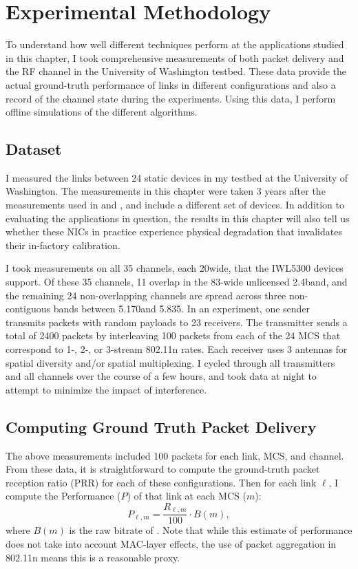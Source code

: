 \section{Experimental Methodology}
To understand how well different techniques perform at the applications studied in this chapter, I took comprehensive measurements of both packet delivery and the RF channel in the University of Washington testbed. These data provide the actual ground-truth performance of links in different configurations and also a record of the channel state during the experiments. Using this data, I perform offline simulations of the different algorithms.

\subsection{Dataset}
I measured the links between 24 static devices in my testbed at the University of Washington. The measurements in this chapter were taken 3 years after the measurements used in  and , and include a different set of devices. In addition to evaluating the applications in question, the results in this chapter will also tell us whether these NICs in practice experience physical degradation that invalidates their in-factory calibration.

I took measurements on all 35 channels, each 20\MHz wide, that the IWL5300 devices support. Of these 35 channels, 11 overlap in the 83\MHz-wide unlicensed 2.4\GHz band, and the remaining 24 non-overlapping channels are spread across three non-contiguous bands between 5.170\GHz and 5.835\GHz. In an experiment, one sender transmits packets with random payloads to 23 receivers. The transmitter sends a total of 2400 packets by interleaving 100 packets from each of the 24 MCS that correspond to 1-, 2-, or 3-stream 802.11n rates. Each receiver uses 3 antennas for spatial diversity and/or spatial multiplexing. I cycled through all transmitters and all channels over the course of a few hours, and took data at night to attempt to minimize the impact of interference.

\subsection{Computing Ground Truth Packet Delivery}
The above measurements included 100 packets for each link, MCS, and channel. From these data, it is straightforward to compute the ground-truth packet reception ratio (PRR) for each of these configurations. Then for each link $\ell$, I compute the Performance ($P$) of that link at each MCS ($m$):
\begin{equation}
	\label{eq:prr_throughput}
	P_{\ell,m} = \frac{R_{\ell,m}}{100} \cdot B(m),
\end{equation}
where $B(m)$ is the raw bitrate of . Note that while this estimate of performance does not take into account MAC-layer effects, the use of packet aggregation in 802.11n means this is a reasonable proxy.

